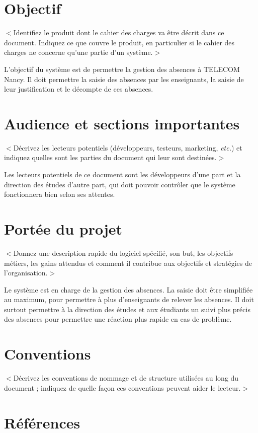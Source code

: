 \documentclass{scrreprt}
\begin{document}
\section{Objectif}
$<$Identifiez le produit dont le cahier des charges va être décrit dans ce document. Indiquez ce que couvre le produit, en particulier si le cahier des charges ne concerne qu'une partie d'un système.$>$

L'objectif du système est de permettre la gestion des absences à TELECOM Nancy. Il doit permettre la saisie des absences par les enseignants, la saisie de leur justification et le décompte de ces absences.

\section{Audience et sections importantes}
$<$Décrivez les lecteurs potentiels (développeurs, testeurs, marketing, \textit{etc.}) et indiquez quelles sont les parties du document qui leur sont destinées.$>$

Les lecteurs potentiels de ce document sont les développeurs d'une part et la direction des études d'autre part, qui doit pouvoir contrôler que le système fonctionnera bien selon ses attentes.

\section{Portée du projet}
$<$Donnez une description rapide du logiciel spécifié, son but, les objectifs métiers, les gains attendus et comment il contribue aux objectifs et stratégies de l'organisation.$>$

Le système est en charge de la gestion des absences. La saisie doit être simplifiée au maximum, pour permettre à plus d'enseignants de  relever les absences. Il doit surtout permettre à la direction des études et aux étudiants un suivi plus précis des absences pour permettre une réaction plus rapide en cas de problème.

\section{Conventions}
$<$Décrivez les conventions de nommage et de structure utilisées au long du document ; indiquez de quelle façon ces conventions peuvent aider le lecteur.$>$

\section{Références}
\end{document}
